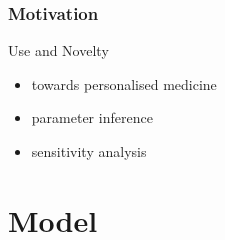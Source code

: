 \documentclass{beamer}
\begin{document}

\begin{frame}
	\frametitle{Motivation}
	\begin{block}{Use and Novelty}
		\begin{itemize}
			\item towards personalised medicine
			\item parameter inference
			\item sensitivity analysis
		\end{itemize}
	\end{block}
	\vspace{5mm}
\end{frame}

\section{Model}
\end{document}
